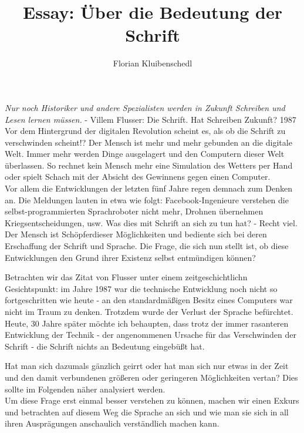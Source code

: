 \documentclass[12pt,a4paper,oneside]{article}
\author{Florian Kluibenschedl}
\title{Essay: Über die Bedeutung der Schrift}
\begin{document}
  \maketitle
  
  \textit{\glqq Nur noch Historiker und andere Spezialisten werden in Zukunft Schreiben und Lesen lernen müssen.\grqq} - Villem Flusser: Die Schrift. Hat Schreiben Zukunft? 1987 \\
  
  Vor dem Hintergrund der digitalen Revolution scheint es, als ob die Schrift zu verschwinden scheint!? Der Mensch ist mehr und mehr gebunden an die digitale Welt. Immer mehr werden Dinge ausgelagert und den Computern dieser Welt überlassen. So rechnet kein Mensch mehr eine Simulation des Wetters per Hand oder spielt Schach mit der Absicht des Gewinnens gegen einen Computer.\\
  
  Vor allem die Entwicklungen der letzten fünf Jahre regen demnach zum Denken an. Die Meldungen lauten in etwa wie folgt: Facebook-Ingenieure verstehen die selbst-programmierten Sprachroboter nicht mehr, Drohnen übernehmen Kriegsentscheidungen, usw. Was dies mit Schrift an sich zu tun hat? - Recht viel. Der Mensch ist \glqq Schöpfer\grqq dieser Möglichkeiten und bediente sich bei deren Erschaffung der Schrift und Sprache. Die Frage, die sich nun stellt ist, ob diese Entwicklungen den Grund ihrer Existenz selbst entmündigen können?
  
  Betrachten wir das Zitat von Flusser unter einem zeitgeschichtlichn Gesichtspunkt: im Jahre 1987 war die technische Entwicklung noch nicht so fortgeschritten wie heute - an den standardmäßigen Besitz eines Computers war nicht im Traum zu denken. Trotzdem wurde der Verlust der Sprache befürchtet. Heute, 30 Jahre später möchte ich behaupten, dass trotz der immer rasanteren Entwicklung der Technik - der angenommenen Ursache für das Verschwinden der Schrift - die Schrift nichts an Bedeutung eingebüßt hat.
  
  Hat man sich dazumals gänzlich geirrt oder hat man sich nur etwas in der Zeit und den damit verbundenen größeren oder geringeren Möglichkeiten vertan? Dies sollte im Folgenden näher analysiert werden. \\
  
  Um diese Frage erst einmal besser verstehen zu können, machen wir einen Exkurs und betrachten auf diesem Weg die Sprache an sich und wie man sie sich in all ihren Ausprägungen anschaulich verständlich machen kann.
  
\end{document}
